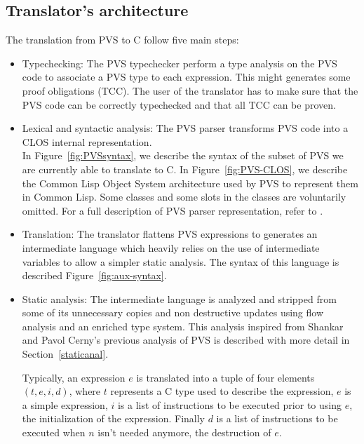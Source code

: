 \documentclass[12pt,a4paper]{article}
\begin{document}
\subsection{Translator's architecture}

The translation from PVS \cite{PVS:manuals} to C follow five main steps:
\begin{itemize}
\item Typechecking: The PVS typechecker \cite{PVS:userguide} perform a type analysis on the PVS code to associate a PVS type to each expression. This might generates some proof obligations (TCC). The user of the translator has to make sure that the PVS code can be correctly typechecked and that all TCC can be proven.

\item Lexical and syntactic analysis: The PVS parser transforms PVS \cite{PVS:language} code into a CLOS internal representation. \\

In Figure~\ref{fig:PVSsyntax}, we describe the syntax of the subset of PVS we are currently able to translate to C.
In Figure~\ref{fig:PVS-CLOS}, we describe the Common Lisp Object System architecture used by PVS to represent them in Common Lisp. Some classes and some slots in the classes are voluntarily omitted. For a full description of PVS parser representation, refer to \cite{PVS:api}.

\item Translation: The translator flattens PVS expressions to generates an intermediate language which heavily relies on the use of intermediate variables to allow a simpler static analysis. The syntax of this language is described Figure~\ref{fig:aux-syntax}.

\item Static analysis: The intermediate language is analyzed and stripped from some of its unnecessary copies and non destructive updates using flow analysis and an enriched type system. This analysis inspired from Shankar \cite{shankar02} and Pavol Cerny's \cite{pavol} previous analysis of PVS is described with more detail in Section~\ref{staticanal}.

Typically, an expression $e$ is translated into a tuple of four elements $(t,e,i,d)$, where $t$ represents a C type used to describe the expression, $e$ is a simple expression, $i$ is a list of instructions to be executed prior to using $e$, the initialization of the expression. Finally $d$ is a list of instructions to be executed when $n$ isn't needed anymore, the destruction of $e$.


\end{itemize}
\end{document}
